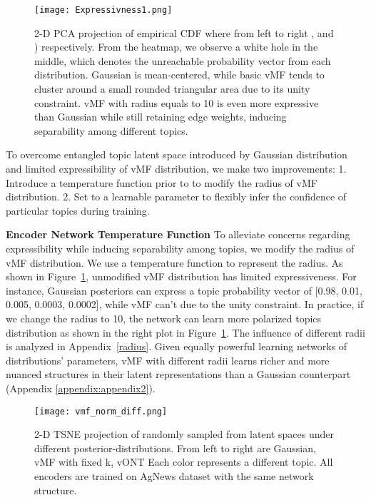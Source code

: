 \documentclass[11pt]{article}
\begin{document}
\begin{figure}
\hspace*{-2.5em}\texttt{[image: Expressivness1.png]}

\caption{2-D PCA projection of empirical CDF  where from left to right ,  and  ) respectively. From the heatmap, we observe a white hole in the middle, which denotes the unreachable probability vector from each distribution. Gaussian is mean-centered, while basic vMF tends to cluster around a small rounded triangular area due to its unity constraint. vMF with radius equals to 10 is even more expressive than Gaussian while still retaining edge weights, inducing separability among different topics.} 
\label{fig:1}
\end{figure}


To overcome entangled topic latent space introduced by Gaussian distribution and limited expressibility of vMF distribution, we make two improvements: 1. Introduce a temperature function  prior to  to modify the radius of vMF distribution. 2. Set  to a learnable parameter to flexibly infer the confidence of particular topics during training. 


\textbf{Encoder Network Temperature Function}
To alleviate concerns regarding expressibility while inducing separability among topics, we modify the radius of vMF distribution. We use a temperature function to represent the radius.  As shown in Figure~\ref{fig:1}, unmodified vMF distribution has limited expressiveness. For instance, Gaussian posteriors can express a topic probability vector of [0.98, 0.01, 0.005, 0.0003, 0.0002], while vMF can't due to the unity constraint. In practice, if we change the radius to 10, the network can learn more polarized topics distribution as shown in the right plot in Figure~\ref{fig:1}. The influence of different radii is analyzed in Appendix~\ref{radius}. Given equally powerful learning networks of distributions' parameters, vMF with different radii learns richer and more nuanced structures in their latent representations than a Gaussian counterpart (Appendix \ref{appendix:appendix2}). 

\begin{figure}
\hspace*{-2.6 em}\texttt{[image: vmf\_norm\_diff.png]}

\caption{2-D TSNE projection of randomly sampled  from latent spaces under different posterior-distributions. From left to right are Gaussian, vMF with fixed k, vONT Each color represents a different topic. All encoders are trained on AgNews dataset with the same network structure. }
\label{fig:2}
\end{figure}
\end{document}
